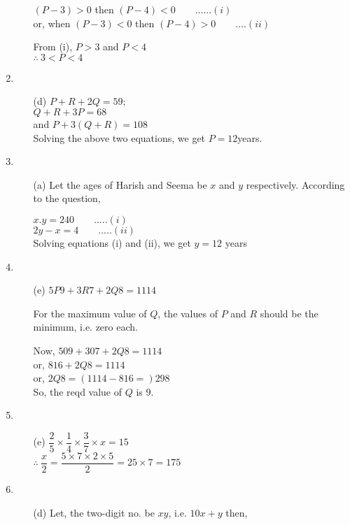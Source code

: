 \begin{multicols}{2}
\begin{enumerate}
\begin{itemize}
    $(P - 3) > 0$ then $(P - 4) < 0 \qquad ......(i)$\\
    or, when $(P - 3) < 0$ then $(P - 4) > 0 \qquad ....(ii)$

    From (i),
    $P > 3$ and $P < 4$\\
    $\therefore~ 3 < P < 4$
  \end{itemize}
\item
  \begin{itemize}
  \item[(d)] $P + R + 2Q = 59;$\\
    $Q + R + 3P = 68$\\
    and $P + 3(Q + R) = 108$\\
    Solving the above two equations, we get $P = 12$years.
  \end{itemize}
\item
  \begin{itemize}
  \item[(a)] Let the ages of Harish and Seema be $x$ and $y$ respectively. According to the question,

    $x . y = 240 \qquad .....(i)$\\
    $2y - x = 4  \qquad .....(ii)$\\
    Solving equations (i) and (ii), we get $y = 12$ years
  \end{itemize}
\item
  \begin{itemize}
  \item[(e)] $5P9 + 3R7 + 2Q8 = 1114$

    For the maximum value of $Q$, the values of $P$ and $R$ should be the minimum, i.e. zero each.

    Now, $509 + 307 + 2Q8 = 1114$\\
    or, $816 + 2Q8 = 1114$\\
    or, $2Q8 = (1114 - 816 =) 298$\\
    So, the reqd value of $Q$ is 9.
  \end{itemize}
\item
  \begin{itemize}
  \item[(e)] $\dfrac{2}{5} \times \dfrac{1}{4} \times \dfrac{3}{7} \times x = 15$\\
    $\therefore~ \dfrac{x}{2} = \dfrac{5 \times 7 \times 2 \times 5}{2} = 25 \times 7 = 175$
  \end{itemize}
\item
  \begin{itemize}
  \item[(d)] Let, the two-digit no. be $xy$, i.e. $10x + y$ then,


\end{itemize}
\end{enumerate}
\end{multicols}
